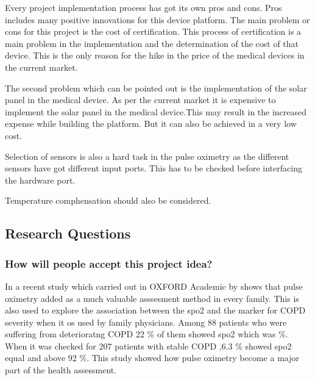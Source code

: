 Every project implementation process has got its own pros and cons. Pros includes many positive innovations for this device platform. The main problem or cons for this project is the cost of certification. This process of certification is a main problem in the implementation and the determination of the cost of that device. This is the only reason for the hike in the price of the medical devices in the current market.

The second problem which can be pointed out is the implementation of the solar panel in the medical device. As per the current market it  is expensive to implement the solar panel in the medical device.This may result in the increased expense while building the platform. But it can also be achieved in a very low cost.

Selection of sensors is also a hard task in the pulse oximetry as the different sensors have got different input ports. This has to be checked before interfacing the hardware port.

Temperature comphensation should also be considered. 


\subsection{Research Questions}



\subsubsection{How will people accept this project idea?}

In a recent study which carried out in OXFORD Academic by \cite{schermer2009pulse,}  shows that  pulse oximetry added as a much valuable asssesment method in every family. 
This is also used to explore the association between the spo2 and the marker for COPD severity when it os used by family physicians.  
Among 88 patients who were suffering from deterioratng COPD 22 \% of them showed spo2 which was  \%.  When it was checked for 207 patients with stable COPD ,6.3 \% showed spo2 equal and above 92 \%.
 This study showed how pulse oximetry become a major part of the health assessment.  

